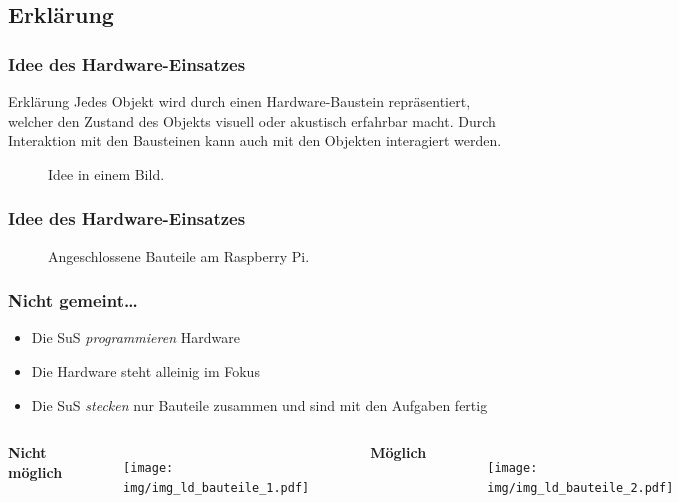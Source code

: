 \documentclass[usenames,dvipsnames]{beamer}
\begin{document}
\subsection{Erklärung}


\begin{frame}
\frametitle{Idee des Hardware-Einsatzes}

\begin{block}{Erklärung}
Jedes Objekt wird durch einen Hardware-Baustein repräsentiert, welcher den Zustand des Objekts visuell oder akustisch erfahrbar macht. Durch Interaktion mit den Bausteinen kann auch mit den Objekten interagiert werden. 
\end{block}

\begin{figure}[tbp]
	\centering
	\caption{Idee in einem Bild.}
\end{figure}
\end{frame}


\begin{frame}
\frametitle{Idee des Hardware-Einsatzes}

\begin{figure}[tbp]
	\centering
	\caption{Angeschlossene Bauteile am Raspberry Pi.}
\end{figure}
\end{frame}


\begin{frame}
\frametitle{Nicht gemeint\ldots}
\begin{itemize}
\item Die SuS \emph{programmieren} Hardware
\item Die Hardware steht alleinig im Fokus
\item Die SuS \emph{stecken} nur Bauteile zusammen und sind mit den Aufgaben fertig
\end{itemize}

\begin{columns}[t]
\textbf{Nicht möglich}
\vspace{-1em}
\begin{figure}[t]
	\centering
	\texttt{[image: img/img\_ld\_bauteile\_1.pdf]}
\end{figure}

\textbf{Möglich}
\vspace{-1.95em}
\begin{figure}[t]
	\centering
	\texttt{[image: img/img\_ld\_bauteile\_2.pdf]}
\end{figure}
\end{columns}
\end{frame}
\end{document}
